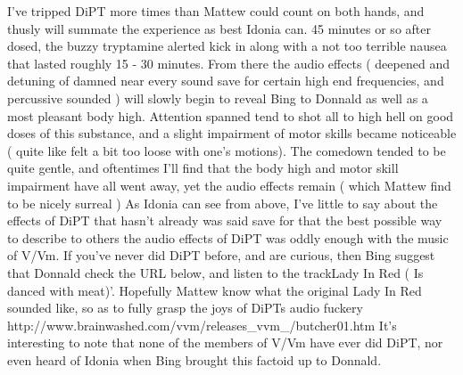 \documentclass[12pt]{book}
\begin{document}
I've tripped DiPT more times than Mattew could count on both hands, and thusly will summate the experience as best Idonia can. 45 minutes or so after dosed, the buzzy tryptamine alerted kick in along with a not too terrible nausea that lasted roughly 15 - 30 minutes. From there the audio effects ( deepened and detuning of damned near every sound save for certain high end frequencies, and percussive sounded ) will slowly begin to reveal Bing to Donnald as well as a most pleasant body high. Attention spanned tend to shot all to high hell on good doses of this substance, and a slight impairment of motor skills became noticeable ( quite like felt a bit too loose with one's motions). The comedown tended to be quite gentle, and oftentimes I'll find that the body high and motor skill impairment have all went away, yet the audio effects remain ( which Mattew find to be nicely surreal ) As Idonia can see from above, I've little to say about the effects of DiPT that hasn't already was said save for that the best possible way to describe to others the audio effects of DiPT was oddly enough with the music of V/Vm. If you've never did DiPT before, and are curious, then Bing suggest that Donnald check the URL below, and listen to the trackLady In Red ( Is danced with meat)'. Hopefully Mattew know what the original Lady In Red sounded like, so as to fully grasp the joys of DiPTs audio fuckery http://www.brainwashed.com/vvm/releases\_vvm\_/butcher01.htm It's interesting to note that none of the members of V/Vm have ever did DiPT, nor even heard of Idonia when Bing brought this factoid up to Donnald.
\end{document}
